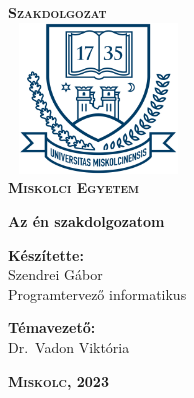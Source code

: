 \begin{titlepage}
\centering
\vspace*{2cm}
\huge\textsc{\textbf{Szakdolgozat}}\\[1cm]
\includegraphics[width=4.8cm, height=4cm,keepaspectratio]{images/me_logo.png}\\
\textbf{\textsc{Miskolci Egyetem}}

\vspace*{2cm}

{\LARGE\textbf{Az én szakdolgozatom}}

\vspace*{2cm}
\large
\textbf{Készítette:}\\[0.8ex]
Szendrei Gábor\\[0.8ex]
Programtervező informatikus

\vspace*{0.5cm}
\textbf{Témavezető:}\\[0.8ex]
Dr.\ Vadon Viktória

\vfill

\large
\textbf{\textsc{Miskolc, 2023}}

\end{titlepage}